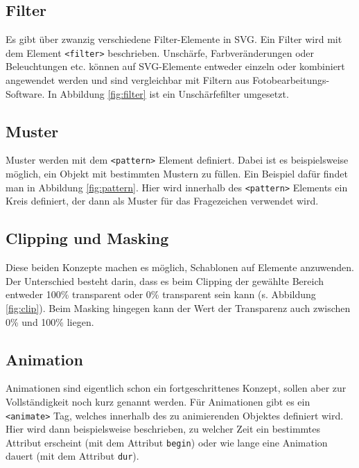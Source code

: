 \subsection{Filter}
Es gibt über zwanzig verschiedene Filter-Elemente in SVG. Ein Filter wird mit dem Element \texttt{<filter>} beschrieben. Unschärfe, Farbveränderungen oder Beleuchtungen etc. können auf SVG-Elemente entweder einzeln oder kombiniert angewendet werden und sind vergleichbar mit Filtern aus Fotobearbeitungs-Software. In Abbildung \ref{fig:filter} ist ein Unschärfefilter umgesetzt.

\subsection{Muster}
Muster werden mit dem \texttt{<pattern>} Element definiert. Dabei ist es beispielsweise möglich, ein Objekt mit bestimmten Mustern zu füllen. Ein Beispiel dafür findet man in Abbildung \ref{fig:pattern}.
Hier wird innerhalb des \texttt{<pattern>} Elements ein Kreis definiert, der dann als Muster für das Fragezeichen verwendet wird.

\subsection{Clipping und Masking}
Diese beiden Konzepte machen es möglich, Schablonen auf Elemente anzuwenden. Der Unterschied besteht darin, dass es beim Clipping der gewählte Bereich entweder 100\% transparent oder 0\% transparent sein kann (s. Abbildung \ref{fig:clip}). Beim Masking hingegen kann der Wert der Transparenz auch zwischen 0\% und 100\% liegen.

\subsection{Animation}
Animationen sind eigentlich schon ein fortgeschrittenes Konzept, sollen aber zur Vollständigkeit noch kurz genannt werden. Für Animationen gibt es ein \texttt{<animate>} Tag, welches innerhalb des zu animierenden Objektes definiert wird. Hier wird dann beispielsweise beschrieben, zu welcher Zeit ein bestimmtes Attribut erscheint (mit dem Attribut \texttt{begin}) oder wie lange eine Animation dauert (mit dem Attribut \texttt{dur}).

\newpage
